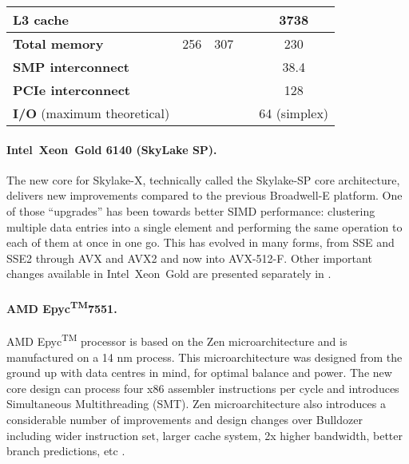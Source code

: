 \begin{table}
\begin{adjustbox}{width=1\textwidth}
\begin{tabular}{l|c|c|c|c|}
\multicolumn{1}{|l|}{\textbf{L3 cache}} &  &  &  & 3738 \\ \hline
\multicolumn{1}{|l|}{\textbf{Total memory}} & 256 & 307 &  & 230 \\ \hline
\multicolumn{1}{|l|}{\textbf{SMP interconnect}} &  &  &  & 38.4 \\ \hline
\multicolumn{1}{|l|}{\textbf{PCIe interconnect}} &  &  &  & 128 \\ \hline
\multicolumn{1}{|l|}{\textbf{I/O} (maximum theoretical)} &  &  &  & 64 (simplex) \\ \hline
\end{tabular}
\end{adjustbox}
\end{table}

\paragraph{Intel\textregistered\ Xeon\textregistered\ Gold 6140 (SkyLake SP).}
The new core for Skylake-X, technically called the Skylake-SP core architecture, delivers new improvements compared to the previous Broadwell-E platform. One of those ``upgrades'' has been towards better SIMD performance: clustering multiple data entries into a single element and performing the same operation to each of them at once in one go. This has evolved in many forms, from SSE and SSE2 through AVX and AVX2 and now into AVX-512-F.
Other important changes available in Intel\textregistered\ Xeon\textregistered\ Gold are presented separately in \cite{INTELXEONGOLD6140}.

\paragraph{AMD Epyc\texorpdfstring{\textsuperscript{TM}}\ 7551.}
AMD Epyc\textsuperscript{TM} processor is based on the Zen microarchitecture and is manufactured on a 14 nm process. This microarchitecture was designed from the ground up with data centres in mind, for optimal balance and power. The new core design can process four x86 assembler instructions per cycle and introduces Simultaneous Multithreading (SMT).
Zen microarchitecture also introduces a considerable number of improvements and design changes over Bulldozer
including wider instruction set, larger cache system, 2x higher bandwidth, better branch predictions, etc
\cite{2019:epyc, now:epyc}.


